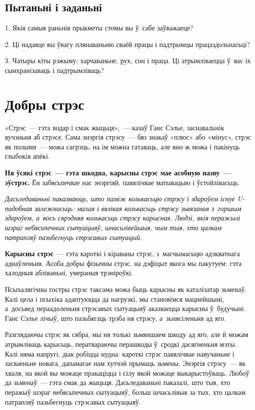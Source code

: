 \subsection*{Пытаньні і заданьні}

1. Якія самыя раньнія прыкметы стомы вы ў~сабе заўважаеце?

2. Ці надаяце вы ўвагу плянаваньню сваёй працы і падтрымцы працаздольнасьці?

3. Чатыры кіты рэжыму: харчаваньне, рух, сон і праца. Ці атрымліваецца ў~вас іх сынхранізаваць і падтрымліваць?


\section{Добры стрэс}

«Стрэс~--- гэта водар і смак жыцьця»,~--- казаў Ганс Сэлье, заснавальнік вучэньня аб стрэсе. Сама энэргія стрэсу~--- бяз знакаў «плюс» або «мінус», стрэс як полымя~--- можа сагрэць, на ім можна гатаваць, але яно ж можа і пакінуць глыбокія апёкі. 

\textbf{Ня ўсякі стрэс~--- гэта шкодна, карысны стрэс мае асобную назву~--- эўстрэс.} Ён забясьпечвае нас энэргіяй, павялічвае матывацыю і ўстойлівасьць. 

\emph{Дасьледаваньні паказваюць, што паміж колькасьцю стрэсу і здароўем існуе U-падобная залежнасьць: малая і вялікая колькасьць стрэсу зьвязаная з~горшым здароўем, а~вось сярэдняя колькасьць стрэсу карысная. Людзі, якія перажылі шэраг небясьпечных сытуацыяў, шчасьлівейшыя, чым тыя, хто цалкам патрапляў пазьбегнуць стрэсавых сытуацый.}

\textbf{Карысны стрэс}~--- гэта кароткі і кіраваны стрэс, з~магчымасьцю адэкватнага аднаўленьня. Асоба добры фізычны стрэс, на дэфіцыт якога мы пакутуем: гэта халодныя абліваньні, умераныя трэніроўкі.

Псыхалягічны гостры стрэс таксама можа быць карысны як каталізатар зьменаў. Калі цела і псыхіка адаптуюцца да нагрузкі, мы становімся мацнейшымі, а~досьвед пераадоленьня стрэсавых сытуацыяў аказваецца карысны ў~будучыні. Ганс Сэлье лічыў, што пазьбягаць трэба ня стрэсу, а~зьнясіленьня ад яго.

Разглядаючы стрэс як сябра, мы ня толькі зьмяншаем шкоду ад яго, але й можам атрымліваць карысьць, ператвараючы перашкоды ў~сродкі дасягненьня мэты. Калі няма напругі, дык робіцца нудна: кароткі стрэс павялічвае навучаньне і засваеньне новага, дапамагае нам хутчэй прымаць зьмены. Энэргія стрэсу~--- як хваля, на якой вы можаце пракаціцца і сілу якой можаце выкарыстоўваць. Любоў да зьменаў~--- гэта смак да жыцьця. Дасьледаваньні паказалі, што тыя, хто перажыў шэраг небясьпечных сытуацыяў, больш шчасьлівыя за тых, хто цалкам патрапляў пазьбегнуць стрэсавых сытуацыяў.

